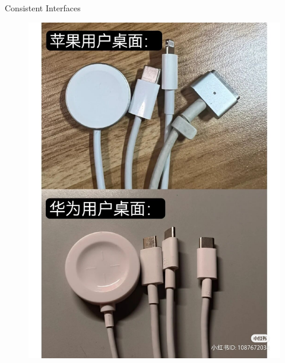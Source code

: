 \begin{frame}{Consistent Interfaces}
    \begin{figure}[h]
        \centering
        \begin{minipage}{0.48\textwidth}
            \centering
            \includegraphics[scale=0.135]{figures/interface1.jpg}
        \end{minipage}
        \begin{minipage}{0.48\textwidth}
            \centering

\end{minipage}
\end{figure}
\end{frame}

